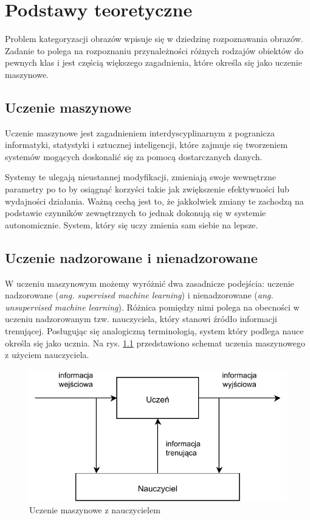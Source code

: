 \chapter{Podstawy teoretyczne}

Problem kategoryzacji obrazów wpisuje się w dziedzinę rozpoznawania obrazów. Zadanie to polega na rozpoznaniu przynależności różnych rodzajów obiektów do pewnych klas\cite{Tad91} i jest częścią większego zagadnienia, które określa się jako uczenie maszynowe.

\section{Uczenie maszynowe}

Uczenie maszynowe jest zagadnieniem interdyscyplinarnym z pogranicza informatyki, statystyki i sztucznej inteligencji, które zajmuje się tworzeniem systemów mogących doskonalić się za pomocą dostarczanych danych.

Systemy te ulegają nieustannej modyfikacji, zmieniają swoje wewnętrzne parametry po to by osiągnąć korzyści takie jak zwiększenie efektywności lub wydajności działania. Ważną cechą jest to, że jakkolwiek zmiany te zachodzą na podstawie czynników zewnętrznych to jednak dokonują się w systemie autonomicznie. System, który się uczy zmienia sam siebie na lepsze.\cite{CICHOSZ00}

\section{Uczenie nadzorowane i nienadzorowane}

W uczeniu maszynowym możemy wyróżnić dwa zasadnicze podejścia: uczenie nadzorowane (\emph{ang. supervised machine learning}) i nienadzorowane (\emph{ang. unsupervised machine learning}). Różnica pomiędzy nimi polega na obecności w uczeniu nadzorowanym tzw. nauczyciela, który stanowi źródło informacji trenującej. Posługując się analogiczną terminologią, system który podlega nauce określa się jako ucznia. Na rys. \ref{fig:supervised-learning} przedstawiono schemat uczenia maszynowego z użyciem nauczyciela.

\begin{figure}[h]
	\centering
	\includegraphics{graphics/01_podstawy_teoretyczne/supervised-learning.pdf}
	\caption{Uczenie maszynowe z nauczycielem \cite{CICHOSZ00}}
	\label{fig:supervised-learning}
\end{figure}

